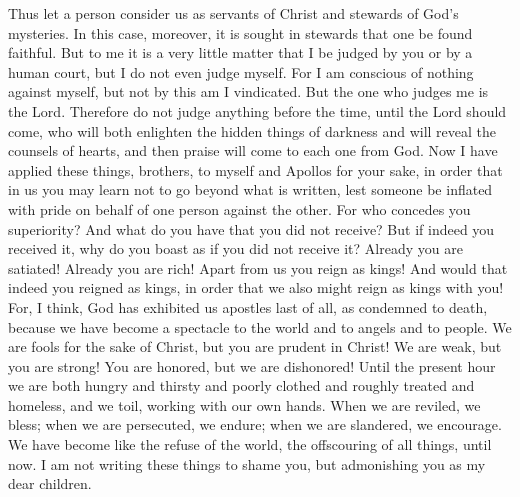 \begin{biblechapter} %
 Thus let a person consider us as servants of Christ and stewards of God’s mysteries.
\verse In this case, moreover, it is sought in stewards that one be found faithful.
\verse But to me it is a very little matter that I be judged by you or by a human court, but I do not even judge myself.
\verse For I am conscious of nothing against myself, but not by this am I vindicated. But the one who judges me is the Lord.
\verse Therefore do not judge anything before the time, until the Lord should come, who will both enlighten the hidden things of darkness and will reveal the counsels of hearts, and then praise will come to each one from God.
 Now I have applied these things, brothers, to myself and Apollos for your sake, in order that in us you may learn not to go beyond what is written, lest someone be inflated with pride on behalf of one person against the other.
\verse For who concedes you superiority? And what do you have that you did not receive? But if indeed you received it, why do you boast as if you did not receive it?
\verse Already you are satiated! Already you are rich! Apart from us you reign as kings! And would that indeed you reigned as kings, in order that we also might reign as kings with you!
\verse For, I think, God has exhibited us apostles last of all, as condemned to death, because we have become a spectacle to the world and to angels and to people.
\verse We are fools for the sake of Christ, but you are prudent in Christ! We are weak, but you are strong! You are honored, but we are dishonored!
\verse Until the present hour we are both hungry and thirsty and poorly clothed and roughly treated and homeless,
\verse and we toil, working with our own hands. When we are reviled, we bless; when we are persecuted, we endure;
\verse when we are slandered, we encourage. We have become like the refuse of the world, the offscouring of all things, until now.
 I am not writing these things to shame you, but admonishing you as my dear children.

\end{biblechapter}
